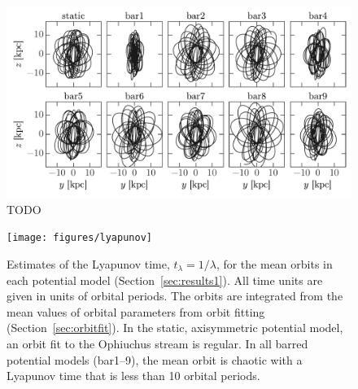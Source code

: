 \documentclass[letterpaper,12pt,preprint]{aastex}
\begin{document}
\clearpage
\begin{figure}[p]
\begin{center}
\includegraphics[width=\textwidth]{figures/orbit-yz}
\caption{  TODO }
\label{fig:orbits-yz}
\end{center}
\end{figure}

\clearpage
\begin{figure}[p]
\begin{center}
\texttt{[image: figures/lyapunov]}
\caption{ Estimates of the Lyapunov time, $t_\lambda=1/\lambda$, for the mean orbits in each potential model (Section~\ref{sec:results1}). All time units are given in units of orbital periods. The orbits are integrated from the mean values of orbital parameters from orbit fitting (Section~\ref{sec:orbitfit}). In the static, axisymmetric potential model, an orbit fit to the Ophiuchus stream is regular. In all barred potential models (bar1--9), the mean orbit is chaotic with a Lyapunov time that is less than 10 orbital periods. }
\label{fig:lyapunov}
\end{center}
\end{figure}
\end{document}
